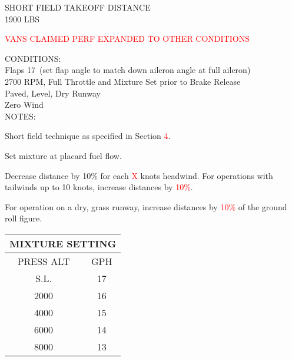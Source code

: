 \begin{sidewaysfigure}[t]
\begin{center}
\begin{perfhdr}SHORT FIELD TAKEOFF DISTANCE\\
1900 LBS
\end{perfhdr}
\Large
\textcolor{red}{VANS CLAIMED PERF EXPANDED TO OTHER CONDITIONS}\vspace{1ex}\\

\begin{minipage}{7.5in}
  \begin{flushleft}
    CONDITIONS:\\
    Flaps 17\textdegree \ (set flap angle to match down aileron angle at full aileron)\\
    2700 RPM, Full Throttle and Mixture Set prior to Brake Release\\
    Paved, Level, Dry Runway\\
    Zero Wind\\
\vspace{\perfnoteskip}
    NOTES:
    \begin{enumerate*}
      \item Short field technique as specified in Section \textcolor{red}{4}.
      \item Set mixture at placard fuel flow.
      \item Decrease distance by 10\% for each \textcolor{red}{X} knots headwind.  For operations with tailwinds up to 10
      knots, increase distances by \textcolor{red}{10\%}.
      \item For operation on a dry, grass runway, increase distances by \textcolor{red}{10\%} of the ground roll figure.
      \end{enumerate*}
    \end{flushleft}
  \end{minipage}
\hfill
\begin{minipage}{1.5in}
  \begin{tabular}{|c|c|}
    \hline
    \multicolumn{2}{|c|}{MIXTURE SETTING}\\
    \hline
    PRESS ALT&GPH\\
    \hline
    S.L.&17\\
    2000&16\\
    4000&15\\
    6000&14\\
    8000&13\\
    \hline
    \end{tabular}
  \end{minipage}
\\


\end{center}
\end{sidewaysfigure}
